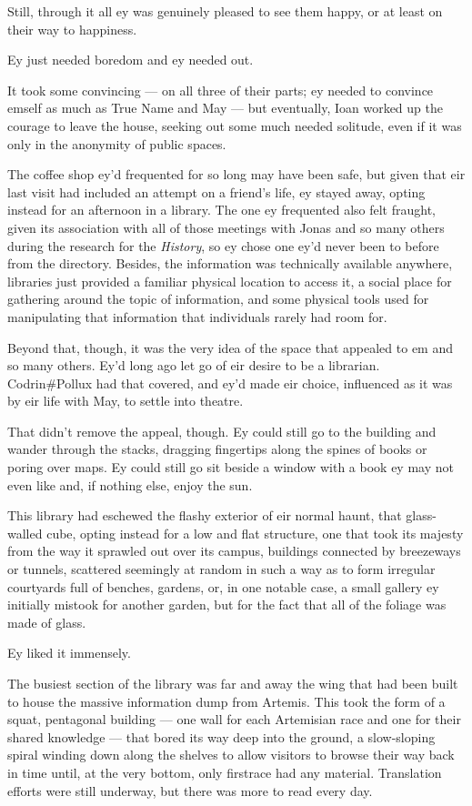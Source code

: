 Still, through it all ey was genuinely pleased to see them happy, or at least on their way to happiness.

Ey just needed boredom and ey needed out.

It took some convincing — on all three of their parts; ey needed to convince emself as much as True Name and May — but eventually, Ioan worked up the courage to leave the house, seeking out some much needed solitude, even if it was only in the anonymity of public spaces.

The coffee shop ey'd frequented for so long may have been safe, but given that eir last visit had included an attempt on a friend's life, ey stayed away, opting instead for an afternoon in a library. The one ey frequented also felt fraught, given its association with all of those meetings with Jonas and so many others during the research for the \emph{History}, so ey chose one ey'd never been to before from the directory. Besides, the information was technically available anywhere, libraries just provided a familiar physical location to access it, a social place for gathering around the topic of information, and some physical tools used for manipulating that information that individuals rarely had room for.

Beyond that, though, it was the very idea of the space that appealed to em and so many others. Ey'd long ago let go of eir desire to be a librarian. Codrin\#Pollux had that covered, and ey'd made eir choice, influenced as it was by eir life with May, to settle into theatre.

That didn't remove the appeal, though. Ey could still go to the building and wander through the stacks, dragging fingertips along the spines of books or poring over maps. Ey could still go sit beside a window with a book ey may not even like and, if nothing else, enjoy the sun.

This library had eschewed the flashy exterior of eir normal haunt, that glass-walled cube, opting instead for a low and flat structure, one that took its majesty from the way it sprawled out over its campus, buildings connected by breezeways or tunnels, scattered seemingly at random in such a way as to form irregular courtyards full of benches, gardens, or, in one notable case, a small gallery ey initially mistook for another garden, but for the fact that all of the foliage was made of glass.

Ey liked it immensely.

The busiest section of the library was far and away the wing that had been built to house the massive information dump from Artemis. This took the form of a squat, pentagonal building — one wall for each Artemisian race and one for their shared knowledge — that bored its way deep into the ground, a slow-sloping spiral winding down along the shelves to allow visitors to browse their way back in time until, at the very bottom, only firstrace had any material. Translation efforts were still underway, but there was more to read every day.

